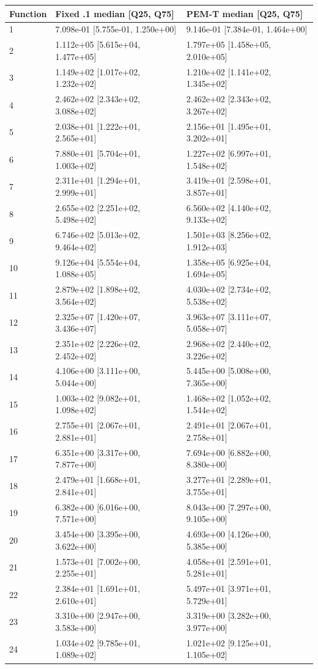 \documentclass[11pt,a4paper]{article}
\begin{document}
\begin{minipage}{\linewidth}
\begin{longtable}[]{@{}lll@{}}
\toprule
Function & Fixed .1 median {[}Q25, Q75{]} & PEM-T median {[}Q25,
Q75{]} \\
\midrule
\endhead
1 & 7.098e-01 {[}5.755e-01, 1.250e+00{]} & 9.146e-01 {[}7.384e-01,
1.464e+00{]} \\
2 & 1.112e+05 {[}5.615e+04, 1.477e+05{]} & 1.797e+05 {[}1.458e+05,
2.010e+05{]} \\
3 & 1.149e+02 {[}1.017e+02, 1.232e+02{]} & 1.210e+02 {[}1.141e+02,
1.345e+02{]} \\
4 & 2.462e+02 {[}2.343e+02, 3.088e+02{]} & 2.462e+02 {[}2.343e+02,
3.267e+02{]} \\
5 & 2.038e+01 {[}1.222e+01, 2.565e+01{]} & 2.156e+01 {[}1.495e+01,
3.202e+01{]} \\
6 & 7.880e+01 {[}5.704e+01, 1.003e+02{]} & 1.227e+02 {[}6.997e+01,
1.548e+02{]} \\
7 & 2.311e+01 {[}1.294e+01, 2.999e+01{]} & 3.419e+01 {[}2.598e+01,
3.857e+01{]} \\
8 & 2.655e+02 {[}2.251e+02, 5.498e+02{]} & 6.560e+02 {[}4.140e+02,
9.133e+02{]} \\
9 & 6.746e+02 {[}5.013e+02, 9.464e+02{]} & 1.501e+03 {[}8.256e+02,
1.912e+03{]} \\
10 & 9.126e+04 {[}5.554e+04, 1.088e+05{]} & 1.358e+05 {[}6.925e+04,
1.694e+05{]} \\
11 & 2.879e+02 {[}1.898e+02, 3.564e+02{]} & 4.030e+02 {[}2.734e+02,
5.538e+02{]} \\
12 & 2.325e+07 {[}1.420e+07, 3.436e+07{]} & 3.963e+07 {[}3.111e+07,
5.058e+07{]} \\
13 & 2.351e+02 {[}2.226e+02, 2.452e+02{]} & 2.968e+02 {[}2.440e+02,
3.226e+02{]} \\
14 & 4.106e+00 {[}3.111e+00, 5.044e+00{]} & 5.445e+00 {[}5.008e+00,
7.365e+00{]} \\
15 & 1.003e+02 {[}9.082e+01, 1.098e+02{]} & 1.468e+02 {[}1.052e+02,
1.544e+02{]} \\
16 & 2.755e+01 {[}2.067e+01, 2.881e+01{]} & 2.491e+01 {[}2.067e+01,
2.758e+01{]} \\
17 & 6.351e+00 {[}3.317e+00, 7.877e+00{]} & 7.694e+00 {[}6.882e+00,
8.380e+00{]} \\
18 & 2.479e+01 {[}1.668e+01, 2.841e+01{]} & 3.277e+01 {[}2.289e+01,
3.755e+01{]} \\
19 & 6.382e+00 {[}6.016e+00, 7.571e+00{]} & 8.043e+00 {[}7.297e+00,
9.105e+00{]} \\
20 & 3.454e+00 {[}3.395e+00, 3.622e+00{]} & 4.693e+00 {[}4.126e+00,
5.385e+00{]} \\
21 & 1.573e+01 {[}7.002e+00, 2.255e+01{]} & 4.058e+01 {[}2.591e+01,
5.281e+01{]} \\
22 & 2.384e+01 {[}1.691e+01, 2.610e+01{]} & 5.497e+01 {[}3.971e+01,
5.729e+01{]} \\
23 & 3.310e+00 {[}2.947e+00, 3.583e+00{]} & 3.319e+00 {[}3.282e+00,
3.977e+00{]} \\
24 & 1.034e+02 {[}9.785e+01, 1.089e+02{]} & 1.021e+02 {[}9.125e+01,
1.105e+02{]} \\
\bottomrule
\end{longtable}


\end{minipage}
\end{document}
